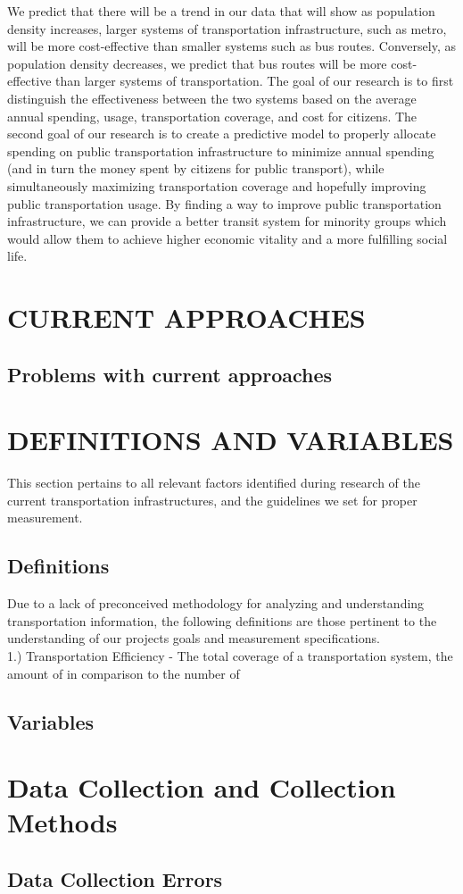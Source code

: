 \documentclass[12pt]{article}
\begin{document}
\begin{multicols}{2}
We predict that there will be a trend in our data that will show as population density increases, larger systems of transportation infrastructure, such as metro, will be more cost-effective than smaller systems such as bus routes. Conversely, as population density decreases, we predict that bus routes will be more cost-effective than larger systems of transportation. The goal of our research is to first distinguish the effectiveness between the two systems based on the average annual spending, usage, transportation coverage, and cost for citizens. The second goal of our research is to create a predictive model to properly allocate spending on public transportation infrastructure to minimize annual spending (and in turn the money spent by citizens for public transport), while simultaneously maximizing transportation coverage and hopefully improving public transportation usage. By finding a way to improve public transportation infrastructure, we can provide a better transit system for minority groups which would allow them to achieve higher economic vitality and a more fulfilling social life.
\section{CURRENT APPROACHES}

\subsection{Problems with current approaches}

\section{DEFINITIONS AND VARIABLES}
This section pertains to all relevant factors identified during research of the current transportation infrastructures, and the guidelines we set for proper measurement.
\subsection{Definitions}
Due to a lack of preconceived methodology for analyzing and understanding transportation information, the following definitions are those pertinent to the understanding of our projects goals and measurement specifications.\\
1.) Transportation Efficiency - The total coverage of a transportation system, the amount of  in comparison to the number of 
\subsection{Variables}

\section{Data Collection and Collection Methods}

\subsection{Data Collection Errors}

	\end{multicols}
\end{document}

